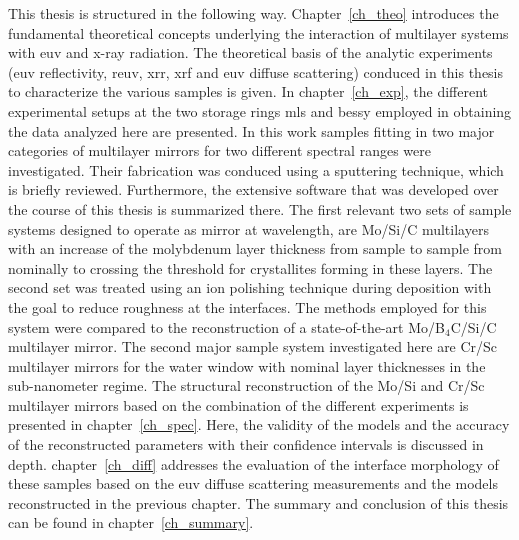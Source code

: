 This thesis is structured in the following way. Chapter~\ref{ch_theo} introduces the fundamental theoretical concepts underlying the interaction of multilayer systems with \gls{euv} and x-ray radiation. The theoretical basis of the analytic experiments (\gls{euv} reflectivity, \gls{reuv}, \gls{xrr}, \gls{xrf} and \gls{euv} diffuse scattering) conduced in this thesis to characterize the various samples is given. In chapter~\ref{ch_exp}, the different experimental setups at the two storage rings \gls{mls} and \gls{bessy} employed in obtaining the data analyzed here are presented. In this work samples fitting in two major categories of multilayer mirrors for two different spectral ranges were investigated. Their fabrication was conduced using a sputtering technique, which is briefly reviewed. Furthermore, the extensive software that was developed over the course of this thesis is summarized there. The first relevant two sets of sample systems designed to operate as mirror at  wavelength, are Mo/Si/C multilayers with an increase of the  molybdenum layer thickness from sample to sample from nominally  to  crossing the threshold for crystallites forming in these layers. The second set was treated using an ion polishing technique during deposition with the goal to reduce roughness at the interfaces. The methods employed for this system were compared to the reconstruction of a state-of-the-art Mo/B$_4$C/Si/C multilayer mirror. The second major sample system investigated here are Cr/Sc multilayer mirrors for the water window with nominal layer thicknesses in the sub-nanometer regime. The structural reconstruction of the Mo/Si and Cr/Sc multilayer mirrors based on the combination of the different experiments is presented in chapter~\ref{ch_spec}. Here, the validity of the models and the accuracy of the reconstructed parameters with their confidence intervals is discussed in depth.  chapter~\ref{ch_diff} addresses the evaluation of the interface morphology of these samples based on the \gls{euv} diffuse scattering measurements and the models reconstructed in the previous chapter. The summary and conclusion of this thesis can be found in chapter~\ref{ch_summary}.

